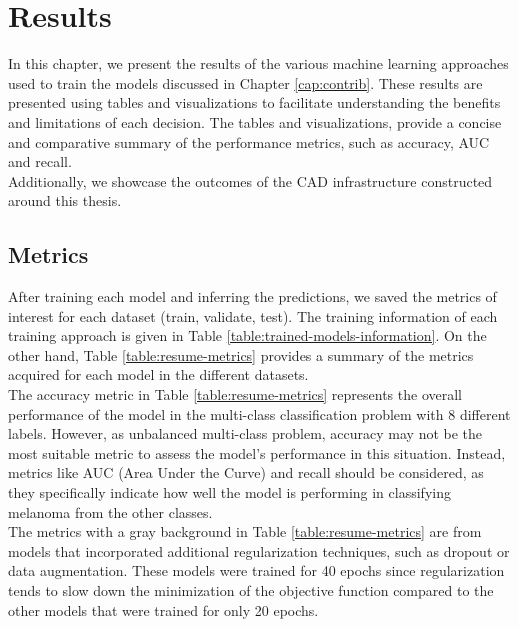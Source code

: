 \chapter{Results} \label{cap:result}

In this chapter, we present the results of the various machine learning
approaches used to train the models discussed in Chapter
\ref{cap:contrib}. These results are presented using tables and visualizations
to facilitate understanding the benefits and limitations of each decision. The
tables and visualizations, provide a concise and comparative summary of the
performance metrics, such as accuracy, AUC and recall. \\

Additionally, we showcase the outcomes of the CAD infrastructure constructed
around this thesis.


\section{Metrics}

After training each model and inferring the predictions, we saved the metrics
of interest for each dataset (train, validate, test). The training information
of each training approach is given in Table
\ref{table:trained-models-information}. On the other hand, Table
\ref{table:resume-metrics} provides a summary of the metrics acquired for each
model in the different datasets. \\

The accuracy metric in Table \ref{table:resume-metrics} represents the
overall performance of the model in the multi-class classification problem with
8 different labels. However, as unbalanced multi-class problem, accuracy may not
be the most suitable metric to assess the model's performance in this
situation. Instead, metrics like AUC (Area Under the Curve) and recall should
be considered, as they specifically indicate how well the model is performing
in classifying melanoma from the other classes. \\

The metrics with a gray background in Table \ref{table:resume-metrics}
are from models that incorporated additional regularization techniques, such as
dropout or data augmentation. These models were trained for 40 epochs since
regularization tends to slow down the minimization of the objective function
compared to the other models that were trained for only 20 epochs. \\

